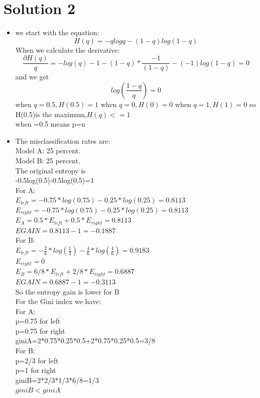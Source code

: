 \documentclass[12pt]{article}
\begin{document}
\section*{Solution 2}
\begin{itemize}
\item we start with the equation:
\begin{equation}
H(q) = -q log q - (1-q) log (1-q)
\end{equation}
When we calculate the derivative:
\begin{equation}
\frac{\partial H(q)}{q}=-log(q)-1-(1-q)*\frac{-1}{(1-q)}-(-1)log(1-q)=0
\end{equation}
and we get 
\begin{equation}
log(\frac{1-q}{q})=0
\end{equation}
when $q=0.5,H(0.5)=1$
when $q=0,H(0)=0$
when $q=1,H(1)=0$
so H(0.5)is the maximum,$H(q)<=1$\\
when =0.5 means p=n



\item
The misclassification rates are:\\
Model A: 25 percent.\\
Model B: 25 percent.\\



The original entropy is\\ -0.5log(0.5)-0.5log(0.5)=1\\
For A:\\
$E_{left}=-0.75*log(0.75)-0.25*log(0.25)=0.8113$\\
$E_{right}=-0.75*log(0.75)-0.25*log(0.25)=0.8113$\\
$E_{A}=0.5*E_{left}+0.5*E_{right}=0.8113$\\
$EGAIN=0.8113-1=-0.1887$\\
For B:\\
$E_{left}=-\frac{2}{6}*log(\frac{1}{3})-\frac{4}{6}*log(\frac{4}{6})=0.9183$\\
$E_{right}=0$\\
$E_{B}=6/8*E_{left}+2/8*E_{right}=0.6887$\\
$EGAIN=0.6887-1=-0.3113$\\
So the entropy gain is lower for B\\


For the Gini index we have:\\
For A:\\
p=0.75 for left\\
p=0.75 for right\\
giniA=2*0.75*0.25*0.5+2*0.75*0.25*0.5=3/8\\
For B:\\
p=2/3 for left\\
p=1 for right\\
giniB=2*2/3*1/3*6/8=1/3\\
$giniB<giniA$\\







\end{itemize}
\end{document}
